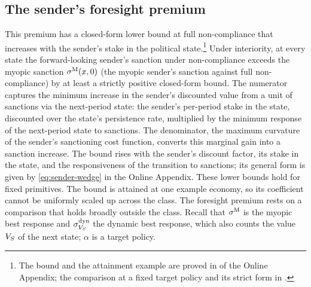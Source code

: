 \subsection{The sender's foresight premium}
\label{sec:results:wedge}
\label{sec:compstat}

 This premium has a closed-form lower bound at
full non-compliance that increases with the sender's stake in the political
state.\footnote{The bound
and the attainment example are proved in  of the Online
Appendix; the comparison at a fixed target policy and its strict form in
.} Under interiority, at every state the forward-looking sender's sanction
under non-compliance exceeds the myopic sanction $\sigma^{\mathrm{M}}(x,0)$ (the myopic sender's sanction against full
non-compliance) by at least a strictly positive closed-form bound. The numerator captures the minimum increase in the
sender's discounted value from a unit of sanctions via the next-period state: the
sender's per-period stake in the state, discounted over the state's persistence rate,
multiplied by the minimum response of the next-period state to sanctions. The
denominator, the maximum curvature of the sender's sanctioning cost function, converts
this marginal gain into a sanction increase. The bound rises with the sender's
discount factor, its stake in the state, and the responsiveness of the transition to
sanctions; its general form is given by \eqref{eq:sender-wedge} in the Online Appendix. These lower bounds hold for fixed primitives. The bound is attained at one
example economy, so its coefficient cannot be uniformly scaled up across the class.
The foresight premium rests on a comparison that holds broadly outside the class. Recall that $\sigma^{\mathrm{M}}$ is the myopic best response and
$\sigma^{\mathrm{dyn}}_{V_S}$ the dynamic best response, which also counts the value $V_S$ of the next
state; $\alpha$ is a target policy.

